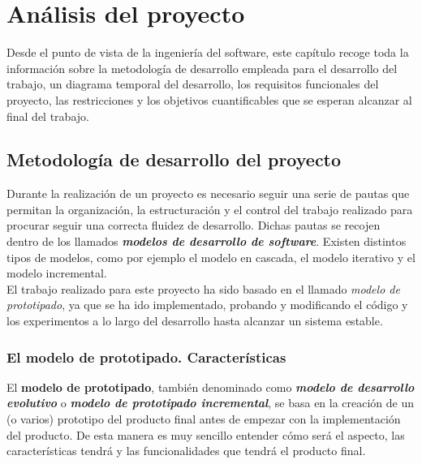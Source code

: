 
\chapter{Análisis del proyecto}

Desde el punto de vista de la ingeniería del software, este capítulo recoge toda la información sobre la metodología de desarrollo empleada para el desarrollo del trabajo, un diagrama temporal del desarrollo, los requisitos funcionales del proyecto, las restricciones y los objetivos cuantificables que se esperan alcanzar al final del trabajo. 

\section{Metodología de desarrollo del proyecto}

Durante la realización de un proyecto es necesario seguir una serie de pautas que permitan la organización, la estructuración y el control del trabajo realizado para procurar seguir una correcta fluidez de desarrollo. Dichas pautas se recojen dentro de los llamados \textbf{\textit{modelos de desarrollo de software}}. Existen distintos tipos de modelos, como por ejemplo el modelo en cascada, el modelo iterativo y el modelo incremental. \cite{procesosAnalisisSoftware} \\

El trabajo realizado para este proyecto ha sido basado en el llamado \textit{modelo de prototipado}, ya que se ha ido implementado, probando y modificando el código y los experimentos a lo largo del desarrollo hasta alcanzar un sistema estable. \\

\subsection{El modelo de prototipado. Características}

El \textbf{modelo de prototipado}, también denominado como \textbf{\textit{modelo de desarrollo evolutivo}} o \textbf{\textit{modelo de prototipado incremental}}, se basa en la creación de un (o varios) prototipo del producto final antes de empezar con la implementación del producto. De esta manera es muy sencillo entender cómo será el aspecto, las características tendrá y las funcionalidades que tendrá el producto final. \\

